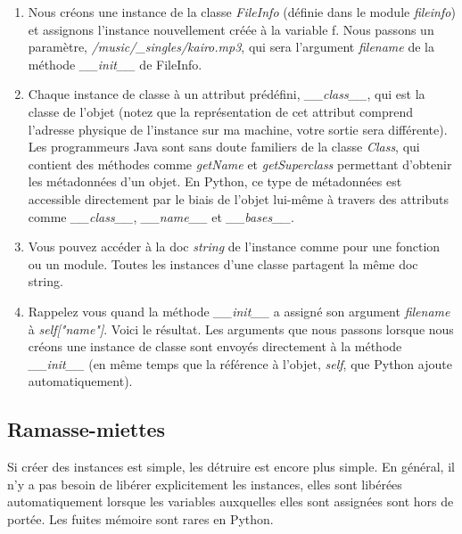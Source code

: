 \begin{enumerate}
\item{Nous créons une instance de la classe \emph{FileInfo} (définie dans le module \emph{fileinfo}) et assignons l'instance nouvellement créée à la variable f. Nous passons un paramètre, \emph{/music/\_singles/kairo.mp3}, qui sera l'argument \emph{filename} de la méthode \emph{\_\_init\_\_} de FileInfo.}
\item{Chaque instance de classe à un attribut prédéfini, \emph{\_\_class\_\_}, qui est la classe de l'objet (notez que la représentation de cet attribut comprend l'adresse physique de l'instance sur ma machine, votre sortie sera différente). Les programmeurs Java sont sans doute familiers de la classe \emph{Class}, qui contient des méthodes comme \emph{getName} et \emph{getSuperclass} permettant d'obtenir les métadonnées d'un objet. En Python, ce type de métadonnées est accessible directement par le biais de l'objet lui-même à travers des attributs comme \emph{\_\_class\_\_}, \emph{\_\_name\_\_} et \emph{\_\_bases\_\_}.}
\item{Vous pouvez accéder à la doc \emph{string} de l'instance comme pour une fonction ou un module. Toutes les instances d'une classe partagent la même doc string.}
\item{Rappelez vous quand la méthode \emph{\_\_init\_\_} a assigné son argument \emph{filename} à \emph{self["name"]}. Voici le résultat. Les arguments que nous passons lorsque nous créons une instance de classe sont envoyés directement à la méthode \emph{\_\_init\_\_} (en même temps que la référence à l'objet, \emph{self}, que Python ajoute automatiquement).}
\end{enumerate}


\subsection{Ramasse-miettes}

Si créer des instances est simple, les détruire est encore plus simple. En général, il n'y a pas besoin de libérer explicitement les instances, elles sont libérées automatiquement lorsque les variables auxquelles elles sont assignées sont hors de portée. Les fuites mémoire sont rares en Python.

